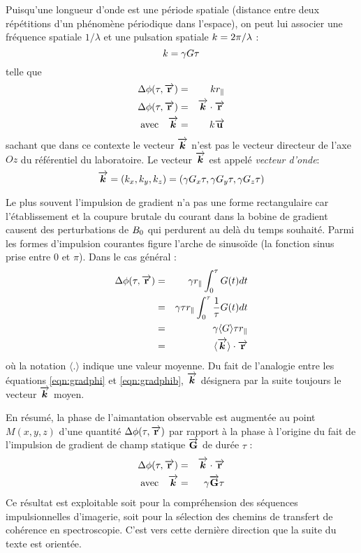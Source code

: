 Puisqu'une longueur d'onde est une période spatiale
(distance entre deux répétitions d'un phénomène périodique dans l'espace), 
on peut lui associer
une fréquence spatiale $1/\lambda$ et une pulsation spatiale $k = 2\pi/\lambda$ :
\begin{equation}
k = \gamma G\tau
\end{equation}
telle que
\begin{eqnarray}
\Delta\phi(\tau,\overrightarrow{\mathbf{r}}) & = & kr_{\|} \\
\label{eqn:gradphi} \Delta\phi(\tau,\overrightarrow{\mathbf{r}}) & = & \overrightarrow{\boldsymbol{k}} \cdot \overrightarrow{\mathbf{r}} \\
\mbox{avec} \quad \overrightarrow{\boldsymbol{k}} & = & k\overrightarrow{\mathbf{u}}
\end{eqnarray}
sachant que dans ce contexte le vecteur $\overrightarrow{\boldsymbol{k}}$ n'est pas le vecteur
directeur de l'axe $Oz$ du référentiel du laboratoire.
Le vecteur $\overrightarrow{\boldsymbol{k}}$ est appelé \emph{vecteur d'onde}:
\begin{equation}
\overrightarrow{\boldsymbol{k}} = (k_x, k_y, k_z) = (\gamma G_x\tau, \gamma G_y\tau, \gamma G_z\tau)
\end{equation}

Le plus souvent l'impulsion de gradient n'a pas une forme rectangulaire car l'établissement
et la coupure brutale du courant dans la bobine de gradient causent des perturbations
de $B_0$ qui perdurent au delà du temps souhaité.
Parmi les formes d'impulsion courantes figure l'arche de sinusoïde (la fonction sinus
prise entre 0 et $\pi$). 
Dans le cas général :
\begin{eqnarray}
\Delta\phi(\tau,\overrightarrow{\mathbf{r}}) & = & \gamma r_{\|} \int_0^{\tau} G(t)dt \\
& = & \gamma\tau r_{\|} \int_0^{\tau} \frac{1}{\tau}G(t)dt \\
& = & \gamma \langle G\rangle \tau r_{\|}  \\
\label{eqn:gradphib} & = & \langle\overrightarrow{\boldsymbol{k}}\rangle\cdot\overrightarrow{\mathbf{r}}
\end{eqnarray}
où la notation $\langle.\rangle$ indique une valeur moyenne.
Du fait de l'analogie entre les équations \ref{eqn:gradphi} et \ref{eqn:gradphib},
$\overrightarrow{\boldsymbol{k}}$ désignera par la suite toujours le vecteur $\overrightarrow{\boldsymbol{k}}$ moyen. 

En résumé, la phase de l'aimantation observable est augmentée au point $M(x,y,z)$ d'une
quantité $\Delta\phi(\tau,\overrightarrow{\mathbf{r}})$ par rapport à la phase à l'origine du fait de l'impulsion de
gradient de champ statique $\overrightarrow{\mathbf{G}}$ de durée $\tau$ :
\begin{eqnarray}
\Delta\phi(\tau,\overrightarrow{\mathbf{r}}) & = & \overrightarrow{\boldsymbol{k}}\cdot\overrightarrow{\mathbf{r}} \\
\mbox{avec}\quad \overrightarrow{\boldsymbol{k}} & = & \gamma\overrightarrow{\mathbf{G}}\tau
\end{eqnarray}
Ce résultat est exploitable soit pour la compréhension des séquences impulsionnelles
d'imagerie, soit pour la sélection des chemins de transfert de cohérence en spectroscopie.
C'est vers cette dernière direction que la suite du texte est orientée.

